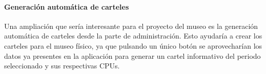 \paragraph*{Generación automática de carteles}
Una ampliación que sería interesante para el proyecto del museo es la generación automática de carteles desde la parte de administración. Esto ayudaría a crear los carteles para el museo físico, ya que pulsando un único botón se aprovecharían los datos ya presentes en la aplicación para generar un cartel informativo del periodo seleccionado y sus respectivas CPUs.

\nocite{*} %
 

